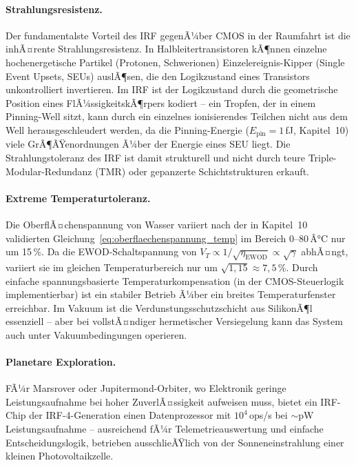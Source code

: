 ﻿\documentclass[a4paper,12pt]{scrreprt}
\theoremstyle{definition}
\begin{document}
\paragraph{Strahlungsresistenz.}
Der fundamentalste Vorteil des IRF gegenÃ¼ber CMOS in der Raumfahrt ist die
inhÃ¤rente Strahlungsresistenz. In Halbleitertransistoren kÃ¶nnen einzelne
hochenergetische Partikel (Protonen, Schwerionen) Einzelereignis-Kipper
(Single Event Upsets, SEUs) auslÃ¶sen, die den Logikzustand eines Transistors
unkontrolliert invertieren. Im IRF ist der Logikzustand durch die geometrische
Position eines FlÃ¼ssigkeitskÃ¶rpers kodiert -- ein Tropfen, der in einem
Pinning-Well sitzt, kann durch ein einzelnes ionisierendes Teilchen nicht
aus dem Well herausgeschleudert werden, da die Pinning-Energie
($E_\text{pin} = 1$\,fJ, Kapitel~10) viele GrÃ¶ÃŸenordnungen Ã¼ber der
Energie eines SEU liegt. Die Strahlungstoleranz des IRF ist damit strukturell
und nicht durch teure Triple-Modular-Redundanz (TMR) oder gepanzerte
Schichtstrukturen erkauft.

\paragraph{Extreme Temperaturtoleranz.}
Die OberflÃ¤chenspannung von Wasser variiert nach der in Kapitel~10 validierten
Gleichung~\eqref{eq:oberflaechenspannung_temp} im Bereich 0--80\,Â°C nur um
15\,\%. Da die EWOD-Schaltspannung von $V_T \propto 1/\sqrt{\eta_\text{EWOD}}
\propto \sqrt{\gamma}$ abhÃ¤ngt, variiert sie im gleichen Temperaturbereich
nur um $\sqrt{1{,}15} \approx 7{,}5$\,\%. Durch einfache spannungsbasierte
Temperaturkompensation (in der CMOS-Steuerlogik implementierbar) ist ein
stabiler Betrieb Ã¼ber ein breites Temperaturfenster erreichbar. Im Vakuum
ist die Verdunstungsschutzschicht aus SilikonÃ¶l essenziell -- aber bei
vollstÃ¤ndiger hermetischer Versiegelung kann das System auch unter Vakuumbedingungen
operieren.

\paragraph{Planetare Exploration.}
FÃ¼r Marsrover oder Jupitermond-Orbiter, wo Elektronik geringe Leistungsaufnahme
bei hoher ZuverlÃ¤ssigkeit aufweisen muss, bietet ein IRF-Chip der IRF-4-Generation
einen Datenprozessor mit $10^4$\,ops/s bei $\sim$pW Leistungsaufnahme --
ausreichend fÃ¼r Telemetrieauswertung und einfache Entscheidungslogik,
betrieben ausschlieÃŸlich von der Sonneneinstrahlung einer kleinen
Photovoltaikzelle.
\end{document}
